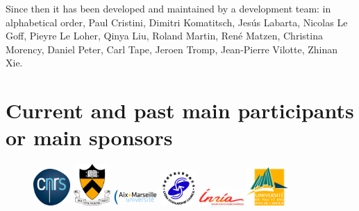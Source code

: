 \documentclass[oneside,english,onecolumn,letterpaper]{book}
\begin{document}
\noindent
Since then it has been developed and maintained by a development team: in alphabetical order,
Paul Cristini,
Dimitri Komatitsch,
Jes\'us Labarta,
Nicolas Le Goff,
Pieyre Le Loher,
Qinya Liu,
Roland Martin,
Ren\'e Matzen,
Christina Morency,
Daniel Peter,
Carl Tape,
Jeroen Tromp,
Jean-Pierre Vilotte,
Zhinan Xie.

\section*{Current and past main participants or main sponsors}

\begin{figure}[htbp]
\noindent \begin{centering}
\includegraphics[width=0.125\textwidth]{figures/logo_cnrs}\vspace*{2truemm}
\includegraphics[width=0.125\textwidth]{figures/logo_princeton}\vspace*{2truemm}
\includegraphics[width=0.15\textwidth]{figures/logo_aix_marseille_universite}\vspace*{0.02truemm}
\includegraphics[width=0.12\textwidth]{figures/logo_CSC_China}\vspace*{0.02truemm}
\includegraphics[width=0.15\textwidth]{figures/logo_inria}\vspace*{2truemm}
\includegraphics[width=0.14\textwidth]{figures/logo_UPPA}
\par\end{centering}


\end{figure}
\end{document}
